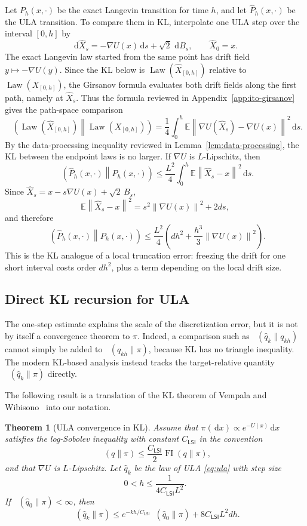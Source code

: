 \documentclass[10pt,a4paper]{amsart}
\numberwithin{equation}{section}
\newtheorem{theorem}{Theorem}[section]
\DeclareMathOperator{\KL}{D_{\mathsf{KL}}}
\DeclareMathOperator{\FI}{FI}
\DeclareMathOperator{\Law}{Law}
\newcommand{\E}{\mathbb{E}}
\newcommand{\dd}{\,\mathrm{d}}
\newcommand{\wh}[1]{\widehat{#1}}
\newcommand{\norm}[1]{\left\lVert #1 \right\rVert}
\begin{document}
Let $P_h(x,\cdot)$ be the exact Langevin transition for time $h$, and let
$\wh P_h(x,\cdot)$ be the ULA transition.  To compare them in KL, interpolate
one ULA step over the interval $[0,h]$ by
\[
    \dd \wh X_s=-\nabla U(x)\dd s+\sqrt2\,\dd B_s,\qquad \wh X_0=x.
\]
The exact Langevin law started from the same point has drift field $y\mapsto-\nabla U(y)$.  Since the KL below is $\Law(\wh X_{[0,h]})$ relative to $\Law(X_{[0,h]})$, the Girsanov formula evaluates both drift fields along the first path, namely at $\wh X_s$. Thus the formula reviewed in Appendix~\ref{app:ito-girsanov} gives the path-space comparison
\[
    \KL\!\left(\Law(\wh X_{[0,h]})\middle\|\Law(X_{[0,h]})\right)
    =
    \frac14
    \int_0^h
    \E\norm{\nabla U(\wh X_s)-\nabla U(x)}^2\dd s.
\]
By the data-processing inequality reviewed in Lemma~\ref{lem:data-processing}, the KL between the endpoint laws is no larger.  If $\nabla U$ is $L$-Lipschitz, then
\[
    \KL\!\left(\wh P_h(x,\cdot)\middle\|P_h(x,\cdot)\right)
    \leq
    \frac{L^2}{4}
    \int_0^h \E\norm{\wh X_s-x}^2\dd s.
\]
Since $\wh X_s=x-s\nabla U(x)+\sqrt2\,B_s$,
\[
    \E\norm{\wh X_s-x}^2=s^2\norm{\nabla U(x)}^2+2ds,
\]
and therefore
\begin{equation}\label{eq:ula-local-kl}
    \KL\!\left(\wh P_h(x,\cdot)\middle\|P_h(x,\cdot)\right)
    \leq
    \frac{L^2}{4}
    \left(dh^2+\frac{h^3}{3}\norm{\nabla U(x)}^2\right).
\end{equation}
This is the KL analogue of a local truncation error: freezing the drift for one short interval costs order $dh^2$, plus a term depending on the local drift size.

\subsection{Direct KL recursion for ULA}

The one-step estimate explains the scale of the discretization error, but it is not by itself a convergence theorem to $\pi$.  Indeed, a comparison such as $\KL(\wh q_k\|q_{kh})$ cannot simply be added to $\KL(q_{kh}\|\pi)$, because KL has no triangle inequality.  The modern KL-based analysis instead tracks the target-relative quantity $\KL(\wh q_k\|\pi)$ directly.

The following result is a translation of the KL theorem of Vempala and Wibisono~\cite{vempala2019rapidula} into our notation.

\begin{theorem}[ULA convergence in KL]\label{thm:ula-kl-vw}
Assume that $\pi(\dd x)\propto e^{-U(x)}\dd x$ satisfies the log-Sobolev
inequality with constant $C_{\mathsf{LSI}}$ in the convention
\[
    \KL(q\|\pi)\leq \frac{C_{\mathsf{LSI}}}{2}\FI(q\|\pi),
\]
and that $\nabla U$ is $L$-Lipschitz.  Let $\wh q_k$ be the law of ULA
\eqref{eq:ula} with step size
\[
    0<h\leq \frac{1}{4C_{\mathsf{LSI}}L^2}.
\]
If $\KL(\wh q_0\|\pi)<\infty$, then
\begin{equation}\label{eq:ula-vw-kl}
    \KL(\wh q_k\|\pi)
    \leq
    e^{-kh/C_{\mathsf{LSI}}}\KL(\wh q_0\|\pi)
    +8C_{\mathsf{LSI}}L^2dh.
\end{equation}
\end{theorem}
\end{document}
